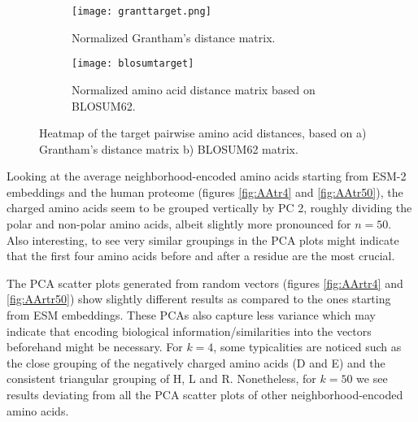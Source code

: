 \begin{figure}[H]
    \centering
    \begin{subfigure}[b]{0.4\textwidth}
        \texttt{[image: granttarget.png]}
        \caption{Normalized Grantham's distance matrix.}
        \label{fig:grant}
    \end{subfigure}
        \hspace{1cm}
    \begin{subfigure}[b]{0.4\textwidth}
        \texttt{[image: blosumtarget]}
        \caption{Normalized amino acid distance matrix based on BLOSUM62.}
        \label{fig:blosum}
    \end{subfigure}
    \caption{Heatmap of the target pairwise amino acid distances, based on a) Grantham's distance matrix b) BLOSUM62 matrix.}
    \label{fig:ga}
    \end{figure}

Looking at the average neighborhood-encoded amino acids starting from ESM-2 embeddings and the human proteome (figures \ref{fig:AAtr4} and \ref{fig:AAtr50}), the charged amino acids seem to be grouped vertically by PC 2, roughly dividing the polar and non-polar amino acids, albeit slightly more pronounced for $n = 50$. Also interesting, to see very similar groupings in the PCA plots might indicate that the first four amino acids before and after a residue are the most crucial.

The PCA scatter plots generated from random vectors (figures \ref{fig:AArtr4} and \ref{fig:AArtr50}) show slightly different results as compared to the ones starting from ESM embeddings. These PCAs also capture less variance which may indicate that encoding biological information/similarities into the vectors beforehand might be necessary. For $k = 4$, some typicalities are noticed such as the close grouping of the negatively charged amino acids (D and E) and the consistent triangular grouping of H, L and R. Nonetheless, for $k = 50$ we see results deviating from all the PCA scatter plots of other neighborhood-encoded amino acids.

